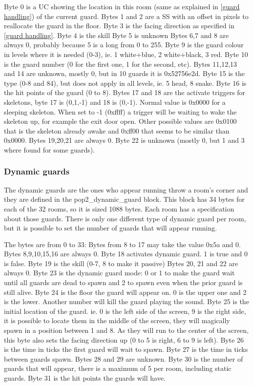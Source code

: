 \documentclass{article}
\begin{document}
 Byte 0 is a UC showing the location in this room (same as explained in
  \ref{guard handling}) of the current guard.
 Bytes 1 and 2 are a SS with an offset in pixels to reallocate the guard in
  the floor.
 Byte 3 is the facing direction as specified in \ref{guard handling}.
 Byte 4 is the skill
 Byte 5 is unknown
 Bytes 6,7 and 8 are always 0, probably because 5 is a long from 0 to 255.
 Byte 9 is the guard colour in levels where it is needed (0-3),
  ie. 1 white+blue, 2 white+black, 3 red.
 Byte 10 is the guard number (0 for the first one, 1 for the second, etc).
 Bytes 11,12,13 and 14 are unknown, mostly 0, but in 10 guards it is
  0x52756e2d.
 Byte 15 is the type (0-8 and 84), but does not apply in all levels,
  ie. 5 head, 8 snake.
 Byte 16 is the hit points of the guard (0 to 8).
 Bytes 17 and 18 are the activate triggers for skeletons, byte 17 is
  (0,1,-1) and 18 is (0,-1). Normal value is 0x0000 for a sleeping
  skeleton. When set to -1 (0xffff) a trigger will be waiting to wake the
  skeleton up, for example the exit door open. Other possible values are
  0x0100 that is the skeleton already awake and 0xff00 that seems to be
  similar than 0x0000.
 Bytes 19,20,21 are always 0.
 Byte 22 is unknown (mostly 0, but 1 and 3 where found for some guards).

\subsubsection{Dynamic guards} %
 
 The dynamic guards are the ones who appear running throw a room's corner
 and they are defined in the pop2\_dynamic\_guard block.
 This block has 34 bytes for each of the 32 rooms, so it is sized 1088
 bytes. Each room has a specification about those guards.
 There is only one different type of dynamic guard per room, but it is
 possible to set the number of guards that will appear running.
 
 The bytes are from 0 to 33:
 Bytes from 8 to 17 may take the value 0x5a and 0. Bytes 8,9,10,15,16 are
  always 0.
 Byte 18 activates dynamic guard. 1 is true and 0 is false.
 Byte 19 is the skill (0-7, 8 to make it passive)
 Bytes 20, 21 and 22 are always 0.
 Byte 23 is the dynamic guard mode: 0 or 1 to make the guard wait until all
  guards are dead to spawn and 2 to spawn even when the prior guard is
  still alive.
 Byte 24 is the floor the guard will appear on. 0 is the upper one and 2 is
  the lower. Another number will kill the guard playing the sound.
 Byte 25 is the initial location of the guard. ie. 0 is the left side of
  the screen, 9 is the right side, it is possible to locate them in the
  middle of the screen, they will magically spawn in a position between 1
  and 8. As they will run to the center of the screen, this byte also sets
  the facing direction up (0 to 5 is right, 6 to 9 is left).
 Byte 26 is the time in ticks the first guard will wait to spawn.
 Byte 27 is the time in ticks between guards spawn.
 Bytes 28 and 29 are unknown.
 Byte 30 is the number of guards that will appear, there is a maximum of 5
  per room, including static guards.
 Byte 31 is the hit points the guards will have.
\end{document}
